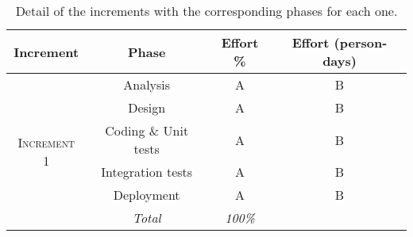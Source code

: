 \begin{table}[hbtp]
\centering
\begin{tabular}{|c|c|c|c|}
\hline
\textbf{Increment} & \textbf{Phase} & \textbf{Effort \%} & \textbf{Effort (person-days)} \\ \hline

\multirow{6}{*}{\textsc{Increment 1}} & Analysis & A & B \\ \cline{2-4}
& Design & A & B \\ \cline{2-4}
& Coding \& Unit tests & A & B \\ \cline{2-4}
& Integration tests & A & B \\ \cline{2-4}
& Deployment & A & B \\ \cline{2-4}
& \textit{Total} & \textit{100\%} & \textit{} \\ \hline

\end{tabular}
\caption{Detail of the increments with the corresponding phases for each one.}
\label{tblIncrementPhases}
\end{table}
